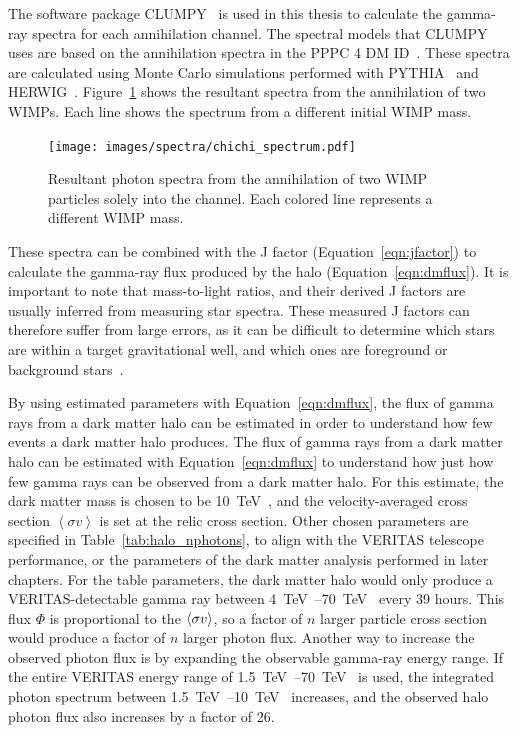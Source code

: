     The software package CLUMPY~\cite{CLUMPYcode} is used in this thesis to calculate the gamma-ray spectra for each annihilation channel.
    The spectral models that CLUMPY uses are based on the annihilation spectra in the PPPC 4 DM ID~\cite{pppc4_dm_spectra,pppc4_ewcorrections}.
    These spectra are calculated using Monte Carlo simulations performed with PYTHIA~\cite{pythia} and HERWIG~\cite{herwig}.
    Figure~\ref{fig:chichi_spectrum} shows the resultant spectra from the annihilation of two WIMPs.
    Each line shows the spectrum from a different initial WIMP mass.

    \begin{figure}[bt]
      \centering
      \texttt{[image: images/spectra/chichi\_spectrum.pdf]}
      \caption[Single Annihilation Spectra]{
        Resultant photon spectra from the annihilation of two WIMP particles solely into the \bbbar channel.
        Each colored line represents a different WIMP mass.
      }
      \label{fig:chichi_spectrum}
    \end{figure}

    These spectra can be combined with the J factor (Equation~\ref{eqn:jfactor}) to calculate the gamma-ray flux produced by the halo (Equation~\ref{eqn:dmflux}).
    It is important to note that mass-to-light ratios, and their derived J factors are usually inferred from measuring star spectra.
    These measured J factors can therefore suffer from large errors, as it can be difficult to determine which stars are within a target gravitational well, and which ones are foreground or background stars~\cite{segue_jfactor_errors}.
    
    By using estimated parameters with Equation~\ref{eqn:dmflux}, the flux of gamma rays from a dark matter halo can be estimated in order to understand how few events a dark matter halo produces.
    The flux of gamma rays from a dark matter halo can be estimated with Equation~\ref{eqn:dmflux} to understand how just how few gamma rays can be observed from a dark matter halo.
    For this estimate, the dark matter mass is chosen to be \SI{10}{\TeV{}}, and the velocity-averaged cross section $\left < \sigma v \right >$ is set at the relic cross section.
    Other chosen parameters are specified in Table~\ref{tab:halo_nphotons}, to align with the VERITAS telescope performance, or the parameters of the dark matter analysis performed in later chapters.
    For the table parameters, the dark matter halo would only produce a VERITAS-detectable gamma ray between \SIrange{4}{70}{\TeV{}} every 39 hours.
    This flux $\Phi$ is proportional to the $\left < \sigma v \right >$, so a factor of $n$ larger particle cross section would produce a factor of $n$ larger photon flux.
    Another way to increase the observed photon flux is by expanding the observable gamma-ray energy range.
    If the entire VERITAS energy range of \SIrange{1.5}{70}{\TeV{}} is used, the integrated photon spectrum between \SIrange{1.5}{10}{\TeV{}} increases, and the observed halo photon flux also increases by a factor of 26.
    
